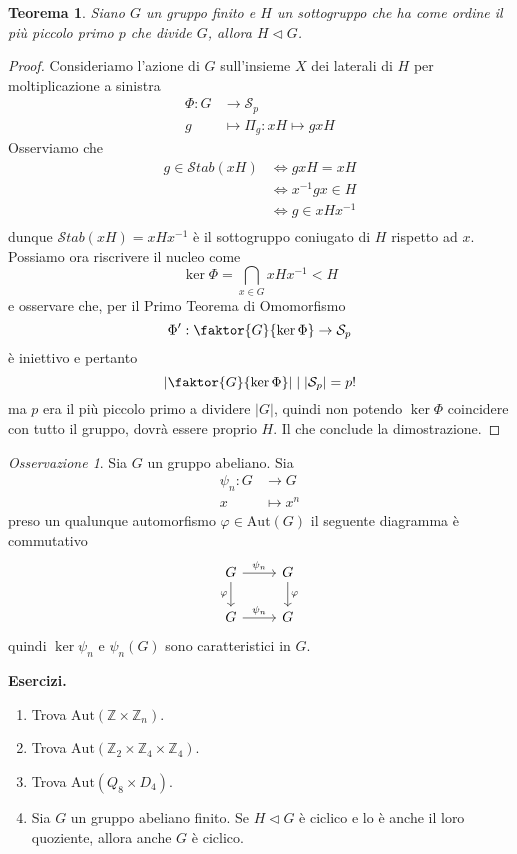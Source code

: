 \documentclass[a4paper]{article}
\newtheorem{theorem}{Teorema}[section]
\theoremstyle{remark}
\newtheorem*{remark}{Osservazione}
\theoremstyle{definition}
\newcommand{\Aut}[1]{\mathrm{Aut}\left( #1 \right)}
\newcommand{\Stab}[1]{\mathcal{S}tab\left( #1 \right)}
\newcommand{\fun}[5]{\begin{align*}
	#1 \colon #2 &\to #3 \\
	#4 &\mapsto #5
	\end{align*}}
\begin{document}
\begin{multicols}{2}
	
\begin{theorem}\label{ppp}
	Siano $ G $ un gruppo finito e $ H $ un sottogruppo che ha come ordine il più piccolo primo $ p $ che divide $ G $, allora $ H \lhd G $.
\end{theorem}
\begin{proof}
	Consideriamo l'azione di $ G $ sull'insieme $ X $ dei laterali di $ H $ per moltiplicazione a sinistra \fun{\Phi}{G}{\mathcal{S}_p}{g}{\Pi_g : xH \mapsto gxH}
	Osserviamo che 
	\begin{align*}
		g \in \Stab{xH} &\Leftrightarrow gxH = xH \\
		&\Leftrightarrow x^{-1}gx \in H \\
		&\Leftrightarrow g \in xHx^{-1} \\
	\end{align*}
	dunque $ \Stab{xH} = xHx^{-1} $ è il sottogruppo coniugato di $ H $ rispetto ad $ x $. Possiamo ora riscrivere il nucleo come
	\[ \ker\Phi = \bigcap_{x \in G} xHx^{-1} < H \]
	e osservare che, per il Primo Teorema di Omomorfismo
	\[ \Phi ' : \faktor{G}{\ker\Phi} \rightarrow \mathcal{S}_p \]
	è iniettivo e pertanto
	\[ \left| \faktor{G}{\ker\Phi} \right| \mid |\mathcal{S}_p| = p! \]
	ma $ p $ era il più piccolo primo a dividere $ |G| $, quindi non potendo $ \ker\Phi $ coincidere con tutto il gruppo, dovrà essere proprio $ H $. Il che conclude la dimostrazione.
\end{proof}

\begin{remark}
	Sia $ G $ un gruppo abeliano. Sia \fun{\psi_n}{G}{G}{x}{x^n} preso un qualunque automorfismo $ \varphi \in \Aut{G} $ il seguente diagramma è commutativo
	\[ \begin{tikzcd}
	G \arrow{r}{\psi _n} \arrow[swap]{d}{\varphi} & G \arrow{d}{\varphi} \\
	G \arrow{r}{\psi _n} & G
	\end{tikzcd}
	\]
	quindi $ \ker\psi _n $ e $ \psi _n(G) $ sono caratteristici in $ G $. \\
	
\end{remark}
	
	\textbf{Esercizi.}
	\begin{enumerate}
		\item Trova $ \Aut{\mathbb{Z}\times\mathbb{Z}_n} $.
		\item Trova $ \Aut{\mathbb{Z}_2\times\mathbb{Z}_4\times\mathbb{Z}_4} $.
		\item Trova $ \Aut{Q_8 \times D_4} $.
		\item Sia $ G $ un gruppo abeliano finito. Se $ H \lhd G $ è ciclico e lo è anche il loro quoziente, allora anche $ G $ è ciclico.
	\end{enumerate}
\end{multicols}
\end{document}
